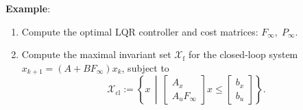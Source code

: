 \begingroup

\textbf{Example}:
\begin{enumerate}
    \item Compute the optimal LQR controller and cost matrices:
    $F_\infty,\;P_\infty$.
    
    \item Compute the maximal invariant set $\mathcal{X}_{\mathrm f}$
    for the closed-loop system
    $x_{k+1}=(A+BF_\infty)x_k$, subject to
    \[
    \mathcal{X}_{\mathrm{cl}}
    :=
    \left\{
    x \,\middle|\,
    \begin{bmatrix}
        A_x\\
        A_uF_\infty
    \end{bmatrix}x
    \le
    \begin{bmatrix}
        b_x\\
        b_u
    \end{bmatrix}
    \right\}.
    \]
\end{enumerate}

